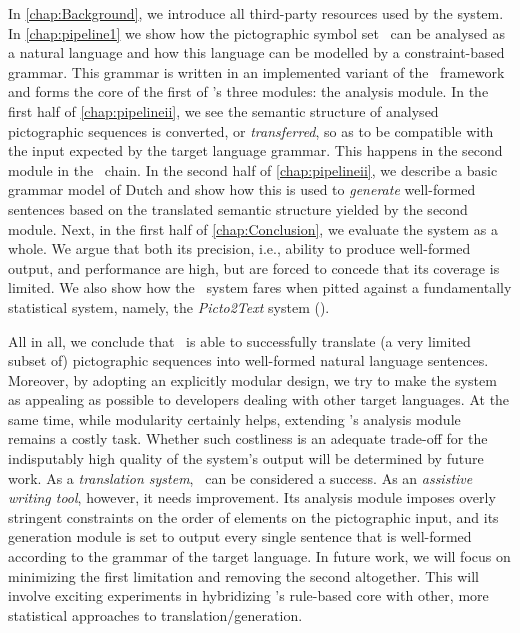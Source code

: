 In \cref{chap:Background}, we introduce all third-party resources used by the
system. In \cref{chap:pipeline1} we show how the pictographic symbol set
\sclera\ can be analysed as a natural language and how this language can be
modelled by a constraint-based grammar. This grammar is written in an
implemented variant of the \hpsg\ framework and forms the core of the first of
\depicto's three modules: the analysis module. In the first half of
\cref{chap:pipelineii}, we see the semantic structure of analysed pictographic
sequences is converted, or \emph{transferred}, so as to be compatible with the
input expected by the target language grammar. This happens in the second
module in the \depicto\ chain. In the second half of \cref{chap:pipelineii}, we
describe a basic grammar model of Dutch and show how this is used to
\emph{generate} well-formed sentences based on the translated semantic
structure yielded by the second module. Next, in the first half of
\cref{chap:Conclusion}, we evaluate the system as a whole. We argue that both
its precision, i.e., ability to produce well-formed output, and performance are
high, but are forced to concede that its coverage is limited. We also show how
the \depicto\ system fares when pitted against a fundamentally statistical
system, namely, the \emph{Picto2Text} system (\citep{sevens2015natural}).

All in all, we conclude that \depicto\ is able to successfully translate (a
very limited subset of) pictographic sequences into well-formed natural
language sentences. Moreover, by adopting an explicitly modular design, we try
to make the system as appealing as possible to developers dealing with other
target languages. At the same time, while modularity certainly helps, extending
\depicto's analysis module remains a costly task. Whether such costliness is an
adequate trade-off for the indisputably high quality of the system's output
will be determined by future work. As a \emph{translation system}, \depicto\
can be considered a success. As an \emph{assistive writing tool}, however, it
needs improvement. Its analysis module imposes overly stringent constraints on
the order of elements on the pictographic input, and its generation module is
set to output every single sentence that is well-formed according to the
grammar of the target language. In future work, we will focus on minimizing the
first limitation and removing the second altogether. This will involve exciting
experiments in hybridizing \depicto's rule-based core with other, more
statistical approaches to translation/generation.
